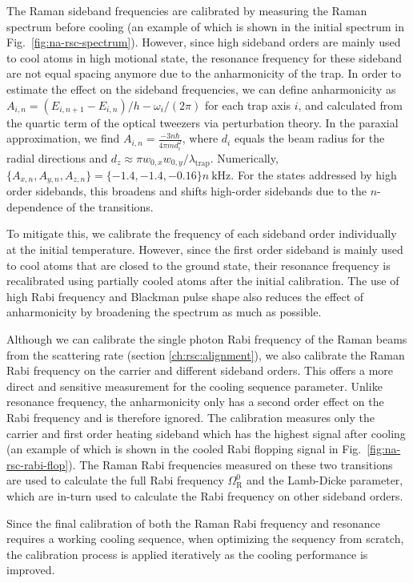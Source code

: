 The Raman sideband frequencies are calibrated by measuring the Raman spectrum before cooling
(an example of which is shown in the initial spectrum in Fig.~\ref{fig:na-rsc-spectrum}).
However, since high sideband orders are mainly used to cool atoms in high motional state,
the resonance frequency for these sideband are not equal spacing anymore due to
the anharmonicity of the trap.
In order to estimate the effect on the sideband frequencies,
we can define anharmonicity as $A_{i,n}=(E_{i,n+1}-E_{i,n})/h - \omega_i/(2\pi)$
for each trap axis $i$, and calculated from the quartic term
of the optical tweezers via perturbation theory.
In the paraxial approximation, we find $A_{i,n}=\frac{-3n\hbar}{4\pi m d_i^2}$,
where $d_i$ equals the beam radius for the radial directions and
$d_z\approx\pi w_{0,x}w_{0,y}/\lambda_{\textrm{trap}}$.
Numerically, $\{A_{x,n},A_{y,n},A_{z,n}\}=\{-1.4, -1.4, -0.16\}n~\mathrm{kHz}$.
For the states addressed by high order sidebands,
this broadens and shifts high-order sidebands
due to the $n$-dependence of the transitions.

To mitigate this, we calibrate the frequency of each sideband order individually
at the initial temperature. However, since the first order sideband is mainly used to cool atoms
that are closed to the ground state,
their resonance frequency  is recalibrated using partially cooled atoms after the initial calibration.
The use of high Rabi frequency and Blackman pulse shape also reduces the effect
of anharmonicity by broadening the spectrum as much as possible.

Although we can calibrate the single photon Rabi frequency of the Raman beams from the scattering rate
(section \ref{ch:rsc:alignment}), we also calibrate the Raman Rabi frequency on the carrier and
different sideband orders.
This offers a more direct and sensitive measurement for the cooling sequence parameter.
Unlike resonance frequency, the anharmonicity only has a second order effect on the Rabi frequency
and is therefore ignored. The calibration measures
only the carrier and first order heating sideband which has the highest signal after cooling
(an example of which is shown in the cooled Rabi flopping signal in Fig.~\ref{fig:na-rsc-rabi-flop}).
The Raman Rabi frequencies measured on these two transitions are used to calculate
the full Rabi frequency $\Omega_{\mathrm{R}}^0$ and the Lamb-Dicke parameter,
which are in-turn used to calculate the Rabi frequency on other sideband orders.

Since the final calibration of both the Raman Rabi frequency and resonance requires a working
cooling sequence, when optimizing the sequency from scratch,
the calibration process is applied iteratively as the cooling performance is improved.

